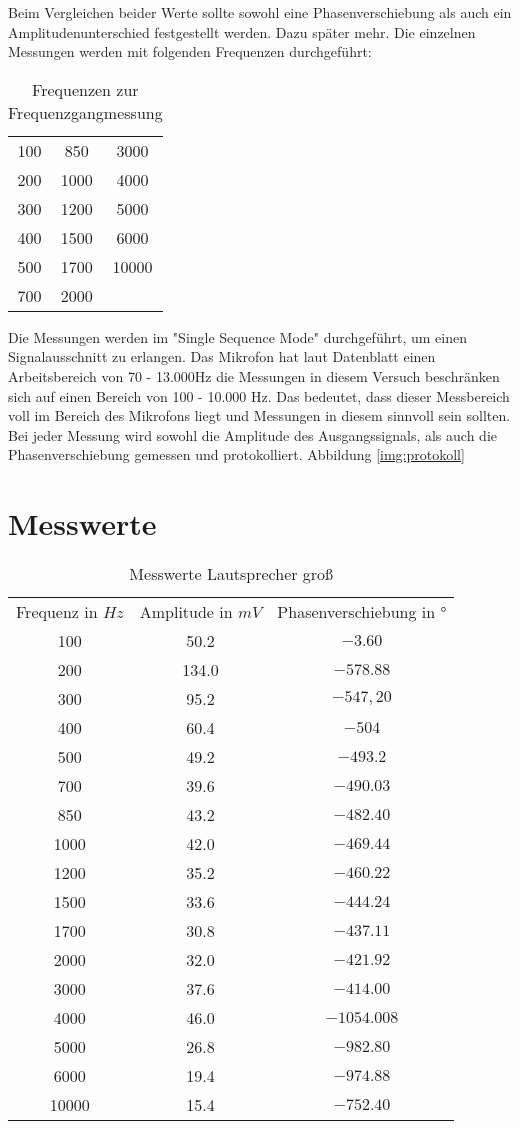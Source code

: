 Beim Vergleichen beider Werte sollte sowohl eine Phasenverschiebung als auch ein Amplitudenunterschied festgestellt werden. Dazu später mehr.
Die einzelnen Messungen werden mit folgenden Frequenzen durchgeführt: 
\begin{table}
\begin{tabular}{|c|c|c|}
100 & 850  & 3000 \\
200 & 1000 & 4000 \\
300 & 1200 & 5000 \\
400 & 1500 & 6000 \\
500 & 1700 & 10000 \\
700 & 2000 & \\
\end{tabular}
\centering
\label{tab:Frequences}
\caption{Frequenzen zur Frequenzgangmessung}
\end{table}
Die Messungen werden im "Single Sequence Mode" durchgeführt, um einen Signalausschnitt zu erlangen. Das Mikrofon hat laut Datenblatt einen Arbeitsbereich von 70 - 13.000Hz die Messungen in diesem Versuch beschränken sich auf einen Bereich von 100 - 10.000 Hz. Das bedeutet, dass dieser Messbereich voll im Bereich des Mikrofons liegt und Messungen in diesem sinnvoll sein sollten.
Bei jeder Messung wird sowohl die Amplitude des Ausgangssignals, als auch die Phasenverschiebung gemessen und protokolliert. Abbildung  \ref{img:protokoll}
\label{chap:VERSUCH_2_FRAGESTELLUNG}

\section{Messwerte}
\label{chap:VERSUCH_2_MESSWERTE}
\begin{table}[H]
\centering
\begin{tabular}{ccc}
  Frequenz in $Hz$ & Amplitude in $mV$ &  Phasenverschiebung in $°$ \\
  100 & 50.2 & $-3.60$ \\
  200 & 134.0 & $-578.88$ \\
  300 & 95.2 & $-547,20$ \\
  400 & 60.4 & $-504$ \\
  500 & 49.2 & $-493.2$ \\
  700 & 39.6 & $-490.03$ \\
  850 & 43.2 & $-482.40$ \\
  1000 & 42.0 & $-469.44$ \\
  1200 & 35.2 & $-460.22$ \\
  1500 & 33.6 & $-444.24$ \\
  1700 & 30.8 & $-437.11$ \\
  2000 & 32.0 & $-421.92$ \\
  3000 & 37.6 & $-414.00$ \\
  4000 & 46.0 & $-1054.008$ \\
  5000 & 26.8 & $-982.80$ \\
  6000 & 19.4 & $-974.88$ \\
  10000 & 15.4 & $-752.40$ \\
 \end{tabular}
\label{tab:MLg}
\caption{Messwerte Lautsprecher groß}
\end{table}

